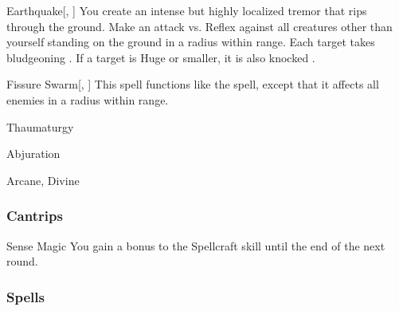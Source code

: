 \lowercase{\hypertarget{spell:Earthquake}{}}\label{spell:Earthquake}
\begin{freeability}[\nth{6}]{\hypertarget{spell:Earthquake}{Earthquake}}[, ]
You create an intense but highly localized tremor that rips through the ground.
Make an attack vs. Reflex against all creatures other than yourself standing on the ground in a \areamed radius within \rngmed range.
\hit Each target takes bludgeoning .
If a target is Huge or smaller, it is also knocked .
\end{freeability}
\vspace{0.25em}



\lowercase{\hypertarget{spell:Fissure Swarm}{}}\label{spell:Fissure Swarm}
\begin{freeability}[\nth{7}]{\hypertarget{spell:Fissure Swarm}{Fissure Swarm}}[, ]
This spell functions like the  spell, except that it affects all enemies in a \areamed radius within \rngmed range.
\end{freeability}
\vspace{0.25em}


\newpage
\begin{spellsection}{Thaumaturgy}

\begin{spellheader}
\end{spellheader}


 Abjuration

 Arcane, Divine

\subsubsection{Cantrips}


\begin{apability}{Sense Magic}
You gain a  bonus to the Spellcraft skill until the end of the next round.
\end{apability}

\end{spellsection}


\subsubsection{Spells}


